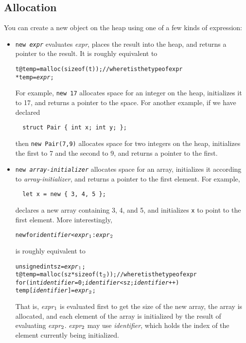 \subsection{Allocation}
You can create a new object on the heap using one of a few kinds of
expression: 
\begin{itemize}
\item \texttt{new {\it expr}} evaluates \textit{expr}, places the
  result into the heap, and returns a pointer to the result.  It is
  roughly equivalent to
\begin{alltt}
  t @ temp = malloc(sizeof(t)); // where t is the type of expr
  *temp = {\it expr};
\end{alltt}
  For example, \texttt{new 17} allocates space for an integer on the
  heap, initializes it to 17, and returns a pointer to the space.  For
  another example, if we have declared
\begin{verbatim}
  struct Pair { int x; int y; };
\end{verbatim}
  then \texttt{new Pair(7,9)} allocates space for two integers on the
  heap, initializes the first to 7 and the second to 9, and returns a
  pointer to the first.

\item \texttt{new {\it array-initializer}} allocates space for an
  array, initializes it according to \textit{array-initializer}, and
  returns a pointer to the first element.  For example,
\begin{verbatim}
  let x = new { 3, 4, 5 };
\end{verbatim}
  declares a new array containing 3, 4, and 5, and initializes
  \texttt{x} to point to the first element.  More interestingly,
\begin{alltt}
  new \lb for {\it identifier} < {\it expr}\(\sb{1}\) : {\it expr}\(\sb{2}\) \rb
\end{alltt}
  is roughly equivalent to
\begin{alltt}
  unsigned int sz = {\it expr}\(\sb{1}\);
  t @ temp = malloc(sz * sizeof(t\(\sb{2}\))); // where t is the  type of expr
  for (int {\it identifier} = 0; {\it identifier} < sz; {\it identifier}++)
    temp[{\it identifier}] = {\it expr}\(\sb{2}\);
\end{alltt}
  That is, 
  {\it expr}\(\sb{1}\)
  is evaluated first to get the size of the new array,
  the array is allocated, and each element of the array is
  initialized by the result of evaluating
  {\it expr}\(\sb{2}\).
  {\it expr}\(\sb{2}\) may use {\it identifier}, which 
  holds the index of the element currently being initialized.
  

\end{itemize}
